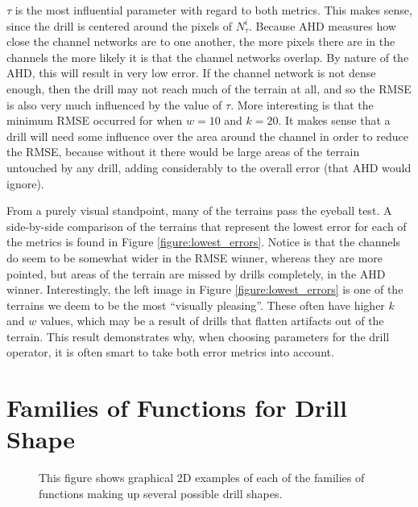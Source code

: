 $\tau$ is the most influential parameter with regard to both metrics. 
This makes sense, since the drill is centered around the pixels of $N^{i}_{\tau}$. 
Because AHD measures how close the channel networks are to one another, the more pixels there are in the channels the more likely it is that the channel networks overlap. By nature of the AHD, this will result in very low error. If the channel network is not dense enough, then the drill may not reach much of the terrain at all, and so the RMSE is also very much influenced by the value of $\tau$. More interesting is that the minimum RMSE occurred for when $w = 10$ and $k = 20$. It makes sense that a drill will need some influence over the area around the channel in order to reduce the RMSE, because without it there would be large areas of the terrain untouched by any drill, adding considerably to the overall error (that AHD would ignore). 

From a purely visual standpoint, many of the terrains pass the eyeball test. A side-by-side comparison of the terrains that represent the lowest error for each of the metrics is found in Figure \ref{figure:lowest_errors}. Notice is that the channels do seem to be somewhat wider in the RMSE winner, whereas they are more pointed, but areas of the terrain are missed by drills completely, in the AHD winner. Interestingly, the left image in Figure \ref{figure:lowest_errors} is one of the terrains we deem to be the most ``visually pleasing''. These often have higher $k$ and $w$ values, which may be a result of drills that flatten artifacts out of the terrain. This result demonstrates why, when choosing parameters for the drill operator, it is often smart to take both error metrics into account.


\section{Families of Functions for Drill Shape}
\label{section:FamiliesOfFunctions}

\begin{figure}[t]
  \caption[Graphical representations of drill shape functions.]{\label{figure:FamiliesOfFunctions} This figure shows graphical 2D examples of each of the families of functions making up several possible drill shapes.}
\end{figure}



